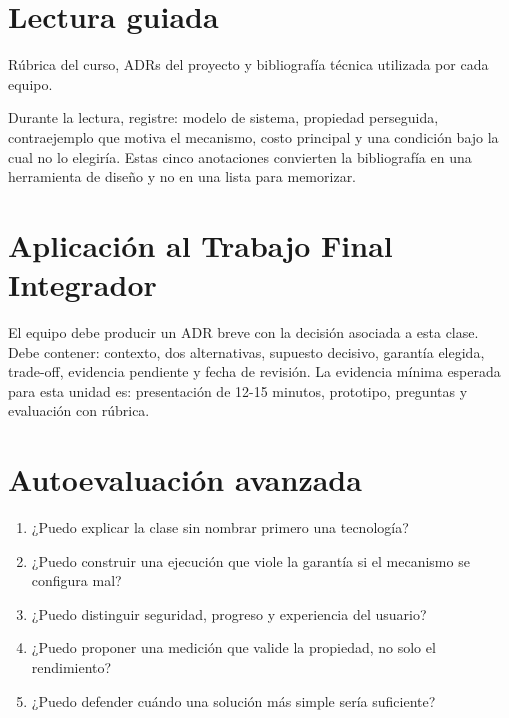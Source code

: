 \documentclass[variant=apuntes,cover=institutional,mode=screen]{ua-engineering-v6-article}
\begin{document}
\section{Lectura guiada}
Rúbrica del curso, ADRs del proyecto y bibliografía técnica utilizada por cada equipo.

Durante la lectura, registre: modelo de sistema, propiedad perseguida, contraejemplo que motiva el mecanismo, costo principal y una condición bajo la cual no lo elegiría. Estas cinco anotaciones convierten la bibliografía en una herramienta de diseño y no en una lista para memorizar.

\section{Aplicación al Trabajo Final Integrador}
El equipo debe producir un ADR breve con la decisión asociada a esta clase. Debe contener: contexto, dos alternativas, supuesto decisivo, garantía elegida, trade-off, evidencia pendiente y fecha de revisión. La evidencia mínima esperada para esta unidad es: presentación de 12-15 minutos, prototipo, preguntas y evaluación con rúbrica.

\section{Autoevaluación avanzada}
\begin{enumerate}
\item ¿Puedo explicar la clase sin nombrar primero una tecnología?
\item ¿Puedo construir una ejecución que viole la garantía si el mecanismo se configura mal?
\item ¿Puedo distinguir seguridad, progreso y experiencia del usuario?
\item ¿Puedo proponer una medición que valide la propiedad, no solo el rendimiento?
\item ¿Puedo defender cuándo una solución más simple sería suficiente?
\end{enumerate}
\end{document}
